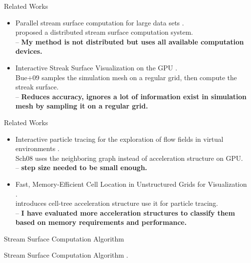 \documentclass{beamer}
\begin{document}
\begin{frame}{Related Works}
	\begin{itemize}
		\item Parallel stream surface computation for large data sets \cite{CampPaper}.\\
		proposed a distributed stream surface computation system.\\
		-- \textbf{My method is not distributed but uses all available computation devices.}
		\item Interactive Streak Surface Visualization on the GPU \cite{BurgerStreakSurface}.\\
		Bue+09 samples the simulation mesh on a regular grid, then compute the streak surface.\\
		-- \textbf{Reduces accuracy, ignores a lot of information exist in simulation mesh by sampling it on a regular grid.}
	\end{itemize}
\end{frame}

\begin{frame}{Related Works}
	\begin{itemize}
		\item Interactive particle tracing for the exploration of flow fields in virtual environments \cite{Schirski:50085}.\\
		Sch08 uses the neighboring graph instead of acceleration
		structure on GPU.\\
		-- \textbf{step size needed to be small enough.}
		\item Fast, Memory-Efficient Cell Location in Unstructured Grids for
		Visualization \cite{GarthPaper}.\\
		introduces cell-tree acceleration structure use it for
		particle tracing.\\
		-- \textbf{I have evaluated more acceleration structures to classify them based on memory requirements and performance.}
	\end{itemize}
\end{frame}

\begin{frame}{Stream Surface Computation Algorithm \cite{CampPaper}}
	\begin{algorithm}[H]

		\caption{Stream Surface Computation Algorithm \cite{CampPaper}.}
	\end{algorithm}
\end{frame}
\end{document}
